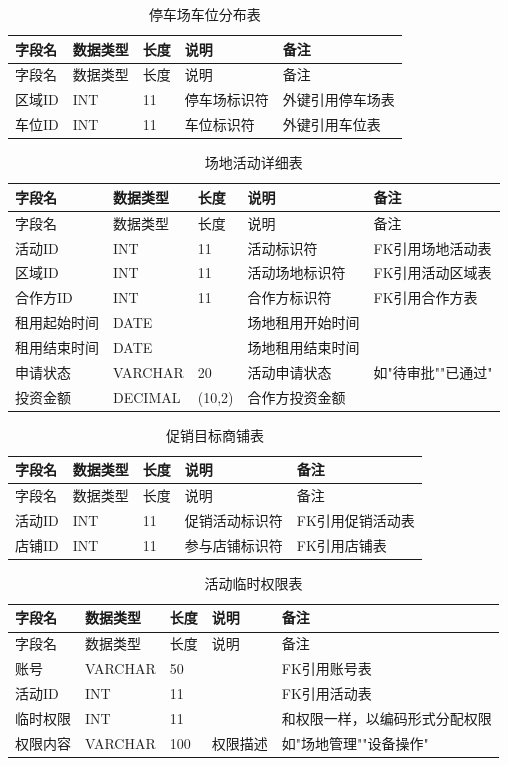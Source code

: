 \documentclass[]{article}
\begin{document}
\begin{longtable}[]{@{}lllll@{}}
\caption{停车场车位分布表}\\
\toprule
字段名 & 数据类型 & 长度 & 说明 & 备注 \\
\midrule
\endfirsthead
\toprule
字段名 & 数据类型 & 长度 & 说明 & 备注 \\
\midrule
\endhead
区域ID & INT & 11 & 停车场标识符 & 外键引用停车场表 \\
车位ID & INT & 11 & 车位标识符 & 外键引用车位表 \\
\bottomrule
\end{longtable}

\begin{longtable}[]{@{}lllll@{}}
\caption{场地活动详细表}\\
\toprule
字段名 & 数据类型 & 长度 & 说明 & 备注 \\
\midrule
\endfirsthead
\toprule
字段名 & 数据类型 & 长度 & 说明 & 备注 \\
\midrule
\endhead
活动ID & INT & 11 & 活动标识符 & FK引用场地活动表 \\
区域ID & INT & 11 & 活动场地标识符 & FK引用活动区域表 \\
合作方ID & INT & 11 & 合作方标识符 & FK引用合作方表 \\
租用起始时间 & DATE &  & 场地租用开始时间 & \\
租用结束时间 & DATE &  & 场地租用结束时间 & \\
申请状态 & VARCHAR & 20 & 活动申请状态 & 如"待审批""已通过" \\
投资金额 & DECIMAL & (10,2) & 合作方投资金额 & \\
\bottomrule
\end{longtable}

\begin{longtable}[]{@{}lllll@{}}
\caption{促销目标商铺表}\\
\toprule
字段名 & 数据类型 & 长度 & 说明 & 备注 \\
\midrule
\endfirsthead
\toprule
字段名 & 数据类型 & 长度 & 说明 & 备注 \\
\midrule
\endhead
活动ID & INT & 11 & 促销活动标识符 & FK引用促销活动表 \\
店铺ID & INT & 11 & 参与店铺标识符 & FK引用店铺表 \\
\bottomrule
\end{longtable}

\begin{longtable}[]{@{}lllll@{}}
\caption{活动临时权限表}\\
\toprule
字段名 & 数据类型 & 长度 & 说明 & 备注 \\
\midrule
\endfirsthead
\toprule
字段名 & 数据类型 & 长度 & 说明 & 备注 \\
\midrule
\endhead
账号 & VARCHAR & 50 &  & FK引用账号表 \\
活动ID & INT & 11 &  & FK引用活动表 \\
临时权限 & INT & 11 &  & 和权限一样，以编码形式分配权限 \\
权限内容 & VARCHAR & 100 & 权限描述 & 如"场地管理""设备操作" \\
\bottomrule
\end{longtable}
\end{document}
